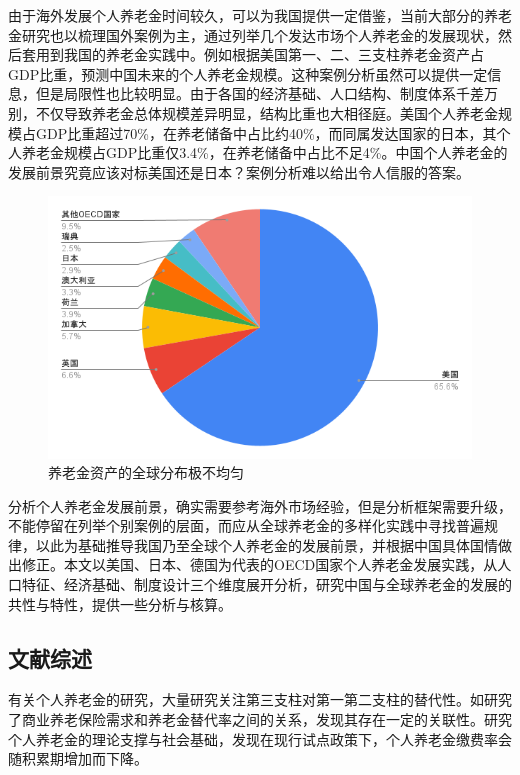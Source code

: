 \documentclass[a4paper,zihao=5]{ctexart}
\begin{document}
由于海外发展个人养老金时间较久，可以为我国提供一定借鉴，当前大部分的养老金研究也以梳理国外案例为主，通过列举几个发达市场个人养老金的发展现状，然后套用到我国的养老金实践中。例如根据美国第一、二、三支柱养老金资产占GDP比重，预测中国未来的个人养老金规模。这种案例分析虽然可以提供一定信息，但是局限性也比较明显。由于各国的经济基础、人口结构、制度体系千差万别，不仅导致养老金总体规模差异明显，结构比重也大相径庭。美国个人养老金规模占GDP比重超过70\%，在养老储备中占比约40\%，而同属发达国家的日本，其个人养老金规模占GDP比重仅3.4\%，在养老储备中占比不足4\%。中国个人养老金的发展前景究竟应该对标美国还是日本？案例分析难以给出令人信服的答案。
\begin{figure}[H]
    \centering
    \includegraphics[width=\linewidth]{img/totalOECDpensionassets.png}
    \caption{养老金资产的全球分布极不均匀}
\end{figure}

分析个人养老金发展前景，确实需要参考海外市场经验，但是分析框架需要升级，不能停留在列举个别案例的层面，而应从全球养老金的多样化实践中寻找普遍规律，以此为基础推导我国乃至全球个人养老金的发展前景，并根据中国具体国情做出修正。本文以美国、日本、德国为代表的OECD国家个人养老金发展实践，从人口特征、经济基础、制度设计三个维度展开分析，研究中国与全球养老金的发展的共性与特性，提供一些分析与核算。
\subsection{文献综述}

有关个人养老金的研究，大量研究关注第三支柱对第一第二支柱的替代性。如\citet{蹇滨徽2021多层次养老保险制度下家庭商业养老保险需求与养老金替代率研究}研究了商业养老保险需求和养老金替代率之间的关系，发现其存在一定的关联性。\citet{路锦非2019第三支柱养老金}研究个人养老金的理论支撑与社会基础，发现在现行试点政策下，个人养老金缴费率会随积累期增加而下降。
\end{document}
